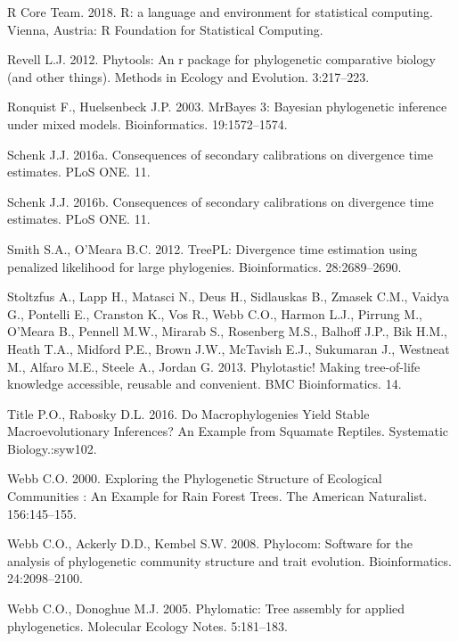 \documentclass[]{article}
\begin{document}
\leavevmode\hypertarget{ref-RCoreTeam2018}{}%
R Core Team. 2018. R: a language and environment for statistical computing. Vienna, Austria: R Foundation for Statistical Computing.

\leavevmode\hypertarget{ref-Revell2012}{}%
Revell L.J. 2012. Phytools: An r package for phylogenetic comparative biology (and other things). Methods in Ecology and Evolution. 3:217--223.

\leavevmode\hypertarget{ref-Ronquist2003}{}%
Ronquist F., Huelsenbeck J.P. 2003. MrBayes 3: Bayesian phylogenetic inference under mixed models. Bioinformatics. 19:1572--1574.

\leavevmode\hypertarget{ref-schenk2016sec}{}%
Schenk J.J. 2016a. Consequences of secondary calibrations on divergence time estimates. PLoS ONE. 11.

\leavevmode\hypertarget{ref-Schenk2016}{}%
Schenk J.J. 2016b. Consequences of secondary calibrations on divergence time estimates. PLoS ONE. 11.

\leavevmode\hypertarget{ref-Smith2012}{}%
Smith S.A., O'Meara B.C. 2012. TreePL: Divergence time estimation using penalized likelihood for large phylogenies. Bioinformatics. 28:2689--2690.

\leavevmode\hypertarget{ref-Stoltzfus2013}{}%
Stoltzfus A., Lapp H., Matasci N., Deus H., Sidlauskas B., Zmasek C.M., Vaidya G., Pontelli E., Cranston K., Vos R., Webb C.O., Harmon L.J., Pirrung M., O'Meara B., Pennell M.W., Mirarab S., Rosenberg M.S., Balhoff J.P., Bik H.M., Heath T.A., Midford P.E., Brown J.W., McTavish E.J., Sukumaran J., Westneat M., Alfaro M.E., Steele A., Jordan G. 2013. Phylotastic! Making tree-of-life knowledge accessible, reusable and convenient. BMC Bioinformatics. 14.

\leavevmode\hypertarget{ref-title2016macrophylogenies}{}%
Title P.O., Rabosky D.L. 2016. Do Macrophylogenies Yield Stable Macroevolutionary Inferences? An Example from Squamate Reptiles. Systematic Biology.:syw102.

\leavevmode\hypertarget{ref-Webb2000}{}%
Webb C.O. 2000. Exploring the Phylogenetic Structure of Ecological Communities : An Example for Rain Forest Trees. The American Naturalist. 156:145--155.

\leavevmode\hypertarget{ref-Webb2008}{}%
Webb C.O., Ackerly D.D., Kembel S.W. 2008. Phylocom: Software for the analysis of phylogenetic community structure and trait evolution. Bioinformatics. 24:2098--2100.

\leavevmode\hypertarget{ref-webb2005phylomatic}{}%
Webb C.O., Donoghue M.J. 2005. Phylomatic: Tree assembly for applied phylogenetics. Molecular Ecology Notes. 5:181--183.
\end{document}
